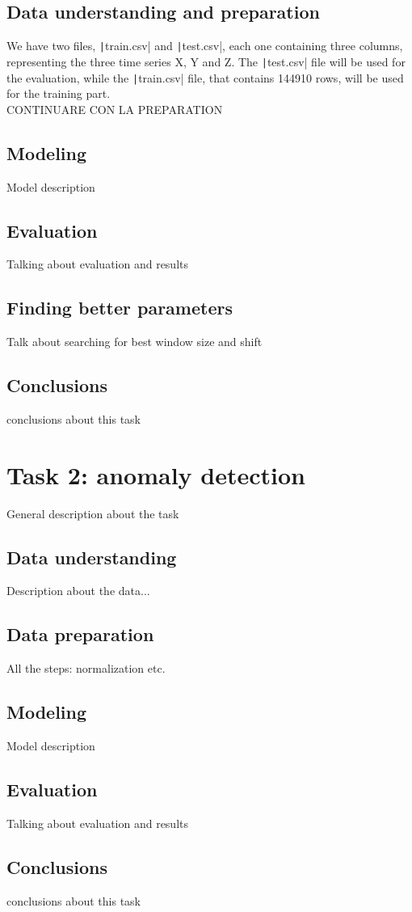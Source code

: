 \documentclass[12pt,a4paper,leqno]{article}
\begin{document}
	\subsection{Data understanding and preparation}
	We have two files, \texttt|train.csv| and \texttt|test.csv|, each one containing three columns, representing the three time series X, Y and Z. The \texttt|test.csv| file will be used for the evaluation, while the \texttt|train.csv| file, that contains 144910 rows, will be used for the training part.\\
	CONTINUARE CON LA PREPARATION

	\subsection{Modeling}
	Model description
	\subsection{Evaluation}
	Talking about evaluation and results
	\subsection{Finding better parameters}
	Talk about searching for best window size and shift
	\subsection{Conclusions}
	conclusions about this task
	
	\newpage
	
	\section{Task 2: anomaly detection}
	General description about the task
	\subsection{Data understanding}
	Description about the data...
	\subsection{Data preparation}
	All the steps: normalization etc.
	\subsection{Modeling}
	Model description
	\subsection{Evaluation}
	Talking about evaluation and results
	\subsection{Conclusions}
	conclusions about this task
\end{document}
